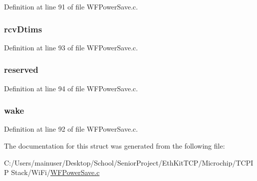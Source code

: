 Definition at line 91 of file W\+F\+Power\+Save.\+c.

\hypertarget{structpwr_mode_request_struct_a48e4d42b0de0d9eb44bc962b2d393ed0}{}
\subsubsection[{rcv\+Dtims}]{ rcv\+Dtims}\label{structpwr_mode_request_struct_a48e4d42b0de0d9eb44bc962b2d393ed0}


Definition at line 93 of file W\+F\+Power\+Save.\+c.

\hypertarget{structpwr_mode_request_struct_a61b1cfce69fc0011cd7b07b127a3f3f6}{}
\subsubsection[{reserved}]{ reserved}\label{structpwr_mode_request_struct_a61b1cfce69fc0011cd7b07b127a3f3f6}


Definition at line 94 of file W\+F\+Power\+Save.\+c.

\hypertarget{structpwr_mode_request_struct_a57f47e7e5da0739eb8c9b2cb1326f2cb}{}
\subsubsection[{wake}]{ wake}\label{structpwr_mode_request_struct_a57f47e7e5da0739eb8c9b2cb1326f2cb}


Definition at line 92 of file W\+F\+Power\+Save.\+c.



The documentation for this struct was generated from the following file\+:\begin{DoxyCompactItemize}
\item 
C\+:/\+Users/mainuser/\+Desktop/\+School/\+Senior\+Project/\+Eth\+Kit\+T\+C\+P/\+Microchip/\+T\+C\+P\+I\+P Stack/\+Wi\+Fi/\hyperlink{_w_f_power_save_8c}{W\+F\+Power\+Save.\+c}\end{DoxyCompactItemize}
